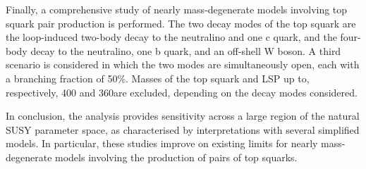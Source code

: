 {
Finally, a comprehensive study of nearly mass-degenerate models
involving top squark pair production is performed. The two decay modes
of the top squark are the loop-induced two-body decay to the
neutralino and one c quark, and the four-body decay to the neutralino,
one b quark, and an off-shell W boson. A third scenario is considered
in which the two modes are simultaneously open, each with a branching
fraction of 50\%. Masses of the top squark and LSP up to,
respectively, 400 and 360\GeV are excluded, depending on the decay
modes considered.
\par}

In conclusion, the analysis provides sensitivity across a large region
of the natural SUSY parameter space, as characterised by
interpretations with several simplified models. In particular, these
studies improve on existing limits for nearly mass-degenerate models
involving the production of pairs of top squarks.

